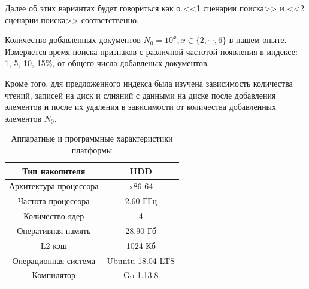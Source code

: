Далее об этих вариантах будет говориться как о <<1 сценарии поиска>> и <<2
сценарии поиска>> соответственно. 

Количество добавленных документов $N_0 = 10^{x}, x \in \{2, \cdots, 6\}$ в нашем опыте.
Измеряется время поиска признаков с различной частотой появления в индексе: 1,
5, 10, 15\%, от общего числа добавленых документов.


Кроме того, для предложенного индекса была изучена зависимость количества чтений,
записей на диск и слияний с данными на диске после добавления элементов и после
их удаления в зависимости от количества добавленных элементов $N_0$.

\begin{table}[H]
\caption{Аппаратные и программные характеристики платформы}
\centering
\small
\singlespacing
\begin{tabular}{|c|c|}
      \hline
      Тип накопителя         & HDD              \\ \hline
      Архитектура процессора & x86-64           \\ \hline
      Частота процессора     & $2.60$ ГГц       \\ \hline
      Количество ядер        & 4                \\ \hline
      Оперативная память     & 28.90 Гб         \\ \hline
      L2 кэш                 & 1024 Кб          \\ \hline
      Операционная система   & Ubuntu 18.04 LTS \\ \hline
      Компилятор             & Go 1.13.8        \\ \hline
\end{tabular}
\label{tab:arch_settings}
\end{table}

